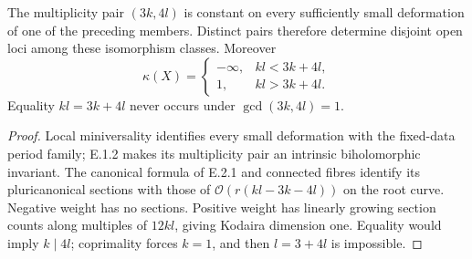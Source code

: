 \begin{proposition}
The multiplicity pair $(3k,4l)$ is constant on every sufficiently
small deformation of one of the preceding members.  Distinct
pairs therefore determine disjoint open loci among these
isomorphism classes.  Moreover
\[
 \kappa(X)=\begin{cases}-\infty,&kl<3k+4l,\\1,&kl>3k+4l.
 \end{cases}
\]
Equality $kl=3k+4l$ never occurs under $\gcd(3k,4l)=1$.
\end{proposition}
\begin{proof}
Local miniversality identifies every small deformation with the
fixed-data period family; E.1.2 makes its multiplicity pair an
intrinsic biholomorphic invariant.  The canonical formula of
E.2.1 and connected fibres identify its pluricanonical sections
with those of $\mathcal O(r(kl-3k-4l))$ on the root curve.
Negative weight has no sections.  Positive weight has linearly
growing section counts along multiples of $12kl$, giving
Kodaira dimension one.  Equality would imply $k\mid4l$;
coprimality forces $k=1$, and then $l=3+4l$ is impossible.
\end{proof}


